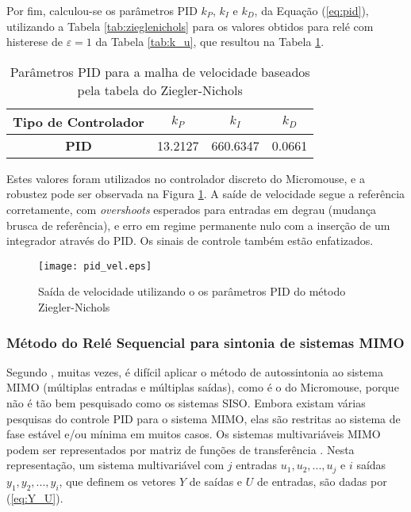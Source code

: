 Por fim, calculou-se os parâmetros PID $k_P$, $k_I$ e $k_D$, da Equação (\ref{eq:pid}), utilizando a Tabela \ref{tab:zieglenichols} para os valores obtidos para relé com histerese de $\varepsilon = 1$ da Tabela \ref{tab:k_u}, que resultou na Tabela \ref{tab:zieglenichols_vel}. 
	
\begin{table}[!htb]
	\centering
	\caption{\label{tab:zieglenichols_vel}Parâmetros PID para a malha de velocidade baseados pela tabela do Ziegler-Nichols}
		\begin{tabular}{c|ccc}
		\textbf{Tipo de Controlador} & \textbf{$k_P$} & \textbf{$k_I$} & \textbf{$k_D$} \\ 
		\hline 
		\textbf{PID} & 13.2127 & 660.6347 & 0.0661 \\ 
		\end{tabular} 
\end{table}


Estes valores foram utilizados no controlador discreto do Micromouse, e a robustez pode ser observada na Figura \ref{fig:PID_siso}. A saíde de velocidade segue a referência corretamente, com \textit{overshoots} esperados para entradas em degrau (mudança brusca de referência), e erro em regime permanente nulo com a inserção de um integrador através do PID. Os sinais de controle também estão enfatizados.

\begin{figure}[!htb]
	\caption{\label{fig:PID_siso}Saída de velocidade utilizando o os parâmetros PID do método Ziegler-Nichols}
	\begin{center}
		\texttt{[image: pid\_vel.eps]}
	\end{center}
\end{figure}

	\subsubsection{Método do Relé Sequencial para sintonia de sistemas MIMO}
	Segundo , muitas vezes, é difícil aplicar o método de autossintonia ao sistema MIMO (múltiplas entradas e múltiplas saídas), como é o do Micromouse, porque não é tão bem pesquisado como os sistemas SISO. Embora existam várias pesquisas do controle PID para o sistema MIMO, elas são restritas ao sistema de fase estável e/ou mínima em muitos casos.
	Os sistemas multivariáveis MIMO podem ser representados por matriz de funções de transferência \cite{katsuhiko2011engenharia}. Nesta representação, um sistema multivariável com $j$ entradas $u_1, u_2, ..., u_j$ e $i$ saídas $y_1, y_2,..., y_i$, que definem os vetores $Y$ de saídas e $U$ de entradas, são dadas por (\ref{eq:Y_U}).
	
